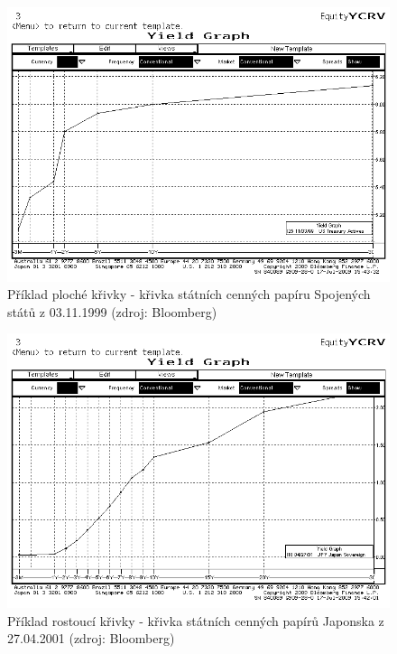 \documentclass[a4paper]{book}
\begin{document}
\begin{figure}
  \includegraphics[bb=0 0 350 250]{curve_flat.bmp}
  \caption{Příklad ploché křivky - křivka státních cenných papíru Spojených států z 03.11.1999 (zdroj: Bloomberg)}
  \label{curve_flat}
\end{figure}
\begin{figure}
  \includegraphics[bb=0 0 350 250]{curve_increasing.bmp}
  \caption{Příklad rostoucí křivky - křivka státních cenných papírů Japonska z 27.04.2001 (zdroj: Bloomberg)}
  \label{curve_increasing}
\end{figure}
\end{document}
